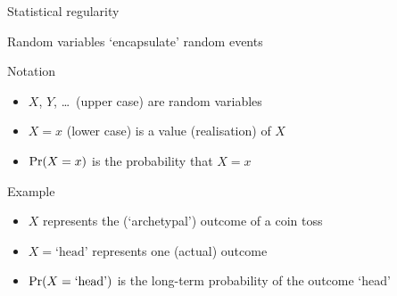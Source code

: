 \begin{frame}{Statistical regularity}
\end{frame}

\begin{frame}[t]{Random variables `encapsulate' random events}
    \begin{block}{Notation}
        \begin{itemize}
            \item $X$, $Y$, \ldots~(upper case) are \alert{random variables}
            \item $X = x$ (lower case) is a value (\alert{realisation}) of $X$
            \item $\Pr\!\left( X = x \right)$ is the \alert{probability} that $X = x$
        \end{itemize}
    \end{block}
    \vfill
    \begin{block}{Example}
        \begin{itemize}
            \item $X$ represents the (`archetypal') outcome of a coin toss
            \item $X = \text{`head'}$ represents one (actual) outcome
            \item $\Pr\!\left( X = \text{`head'} \right)$ is the long\hyp{}term probability
                  of the outcome `head'
        \end{itemize}
    \end{block}
\end{frame}

